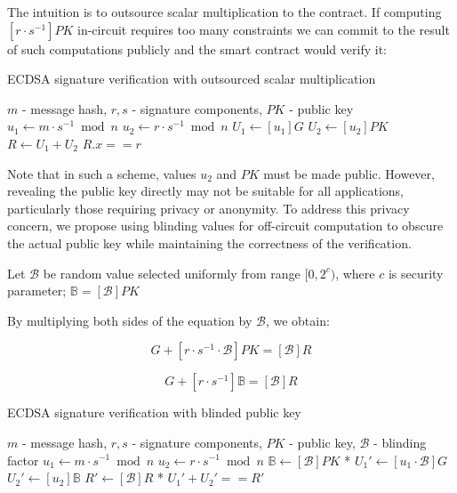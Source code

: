 \documentclass{iacrtrans}
\begin{document}
The intuition is to outsource scalar multiplication to the contract. If computing $[r \cdot s^{-1}] PK$ in-circuit requires too many constraints
we can commit to the result of such computations publicly and the smart contract would verify it:


\begin{algorithm}[H]
  \caption{ECDSA signature verification with outsourced scalar multiplication}
  \begin{algorithmic}[1]
  \Require $m$ - message hash, $r,s$ - signature components, $PK$ - public key
  \State $u_1 \gets m \cdot s^{-1} \bmod n$
  \State $u_2 \gets r \cdot s^{-1} \bmod n$
  \State $U_1 \gets [u_1]G$  
  \State $U_2 \gets [u_2]PK$  
  \State $R \gets U_1 + U_2$
  \State $R.x == r$
  
  \end{algorithmic}
  \end{algorithm}
  
Note that in such a scheme, values $u_2$ and $PK$ must be made public. 
However, revealing the public key directly may not be suitable for all applications, particularly those requiring privacy or anonymity.
To address this privacy concern, we propose using blinding values for off-circuit computation to obscure the actual public key 
while maintaining the correctness of the verification.


Let $\mathcal{B}$ be random value selected uniformly from range $[0, 2^c)$, where $c$ is security parameter; 
$\mathbb{B} = [\mathcal{B}] PK$

By multiplying both sides of the equation by $\mathcal{B}$, we obtain:

\begin{equation}
  [m \cdot s^{-1} \cdot \mathcal{B}] G + [r \cdot s^{-1} \cdot \mathcal{B}] PK = [\mathcal{B}]R
\end{equation}

\begin{equation}
  [m \cdot s^{-1} \cdot \mathcal{B}] G + [r \cdot s^{-1}] \mathbb{B} = [\mathcal{B}]R
\end{equation}


\begin{algorithm}[H]
  \caption{ECDSA signature verification with blinded public key}
  \begin{algorithmic}[1]
  \Require $m$ - message hash, $r,s$ - signature components, $PK$ - public key, $\mathcal{B}$ - blinding factor
  \State $u_1 \gets m \cdot s^{-1} \bmod n$
  \State $u_2 \gets r \cdot s^{-1} \bmod n$
  \State $\mathbb{B} \gets [\mathcal{B}]PK$ * 
  \State $U_1' \gets [u_1 \cdot \mathcal{B}]G$
  \State $U_2' \gets [u_2]\mathbb{B}$  
  \State $R' \gets [\mathcal{B}]R$ * 
  \State $U_1' + U_2' == R'$
  \end{algorithmic}
\end{algorithm}
\end{document}

